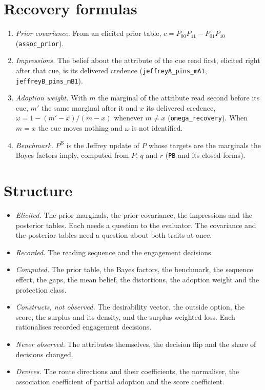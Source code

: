 \documentclass[11pt]{article}
\newcommand{\PB}{P^{\mathrm{B}}}
\newcommand{\lean}[1]{\texttt{\scriptsize #1}}
\begin{document}
\section*{Recovery formulas}

\begin{enumerate}
\item \emph{Prior covariance.} From an elicited prior table,
  $c=P_{00}P_{11}-P_{01}P_{10}$ (\lean{assoc\_prior}).
\item \emph{Impressions.} The belief about the attribute of the cue read
  first, elicited right after that cue, is its delivered credence
  (\lean{jeffreyA\_pins\_mA1}, \lean{jeffreyB\_pins\_mB1}).
\item \emph{Adoption weight.} With $m$ the marginal of the attribute read
  second before its cue, $m'$ the same marginal after it and $x$ its delivered
  credence, $\omega=1-(m'-x)/(m-x)$ whenever $m\neq x$
  (\lean{omega\_recovery}). When $m=x$ the cue moves nothing and $\omega$ is not
  identified.
\item \emph{Benchmark.} $\PB$ is the Jeffrey update of $P$ whose targets are
  the marginals the Bayes factors imply, computed from $P$, $q$ and $r$
  (\lean{PB} and its closed forms).
\end{enumerate}

\section*{Structure}

\begin{itemize}
\item \emph{Elicited.} The prior marginals, the prior covariance, the
  impressions and the posterior tables. Each needs a question to the
  evaluator. The covariance and the posterior tables need a question about both
  traits at once.
\item \emph{Recorded.} The reading sequence and the engagement decisions.
\item \emph{Computed.} The prior table, the Bayes factors, the benchmark, the
  sequence effect, the gaps, the mean belief, the distortions, the adoption
  weight and the protection class.
\item \emph{Constructs, not observed.} The desirability vector, the outside
  option, the score, the surplus and its density, and the surplus-weighted
  loss. Each rationalises recorded engagement decisions.
\item \emph{Never observed.} The attributes themselves, the decision flip and
  the share of decisions changed.
\item \emph{Devices.} The route directions and their coefficients, the
  normaliser, the association coefficient of partial adoption and the score
  coefficient.
\end{itemize}
\end{document}
